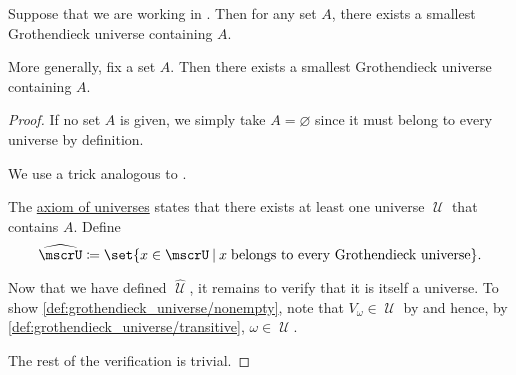 \begin{proposition}\label{thm:smallest_grothendieck_universe_existence}
  Suppose that we are working in . Then for any set \( A \), there exists a smallest Grothendieck universe containing \( A \).

  More generally, fix a set \( A \). Then there exists a smallest Grothendieck universe containing \( A \).
\end{proposition}
\begin{proof}
  If no set \( A \) is given, we simply take \( A = \varnothing \) since it must belong to every universe by definition.

  We use a trick analogous to .

  The \hyperref[def:axiom_of_universes]{axiom of universes} states that there exists at least one universe \( \mscrU \) that contains \( A \). Define
  \begin{equation*}
    \widehat \mscrU \coloneqq \set{ x \in \mscrU \given x \T{belongs to every Grothendieck universe} }.
  \end{equation*}

  Now that we have defined \( \widehat \mscrU \), it remains to verify that it is itself a universe. To show \ref{def:grothendieck_universe/nonempty}, note that \( V_\omega \in \mscrU \) by  and hence, by \ref{def:grothendieck_universe/transitive}, \( \omega \in \mscrU \).

  The rest of the verification is trivial.
\end{proof}

